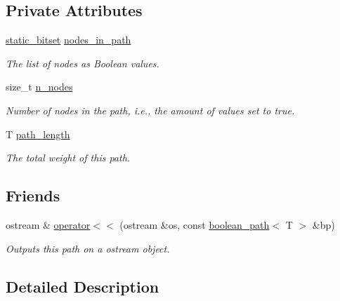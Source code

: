 \subsection*{Private Attributes}
\begin{DoxyCompactItemize}
\item 
\hyperlink{classlgraph_1_1utils_1_1static__bitset}{static\+\_\+bitset} \hyperlink{classlgraph_1_1utils_1_1boolean__path_ab94143c4100d65e2989fb150d6112818}{nodes\+\_\+in\+\_\+path}
\begin{DoxyCompactList}\small\item\em The list of nodes as Boolean values. \end{DoxyCompactList}\item 
size\+\_\+t \hyperlink{classlgraph_1_1utils_1_1boolean__path_a9798bc25ba71adebcd38abe36db471ca}{n\+\_\+nodes}\hypertarget{classlgraph_1_1utils_1_1boolean__path_a9798bc25ba71adebcd38abe36db471ca}{}\label{classlgraph_1_1utils_1_1boolean__path_a9798bc25ba71adebcd38abe36db471ca}

\begin{DoxyCompactList}\small\item\em Number of nodes in the path, i.\+e., the amount of values set to true. \end{DoxyCompactList}\item 
T \hyperlink{classlgraph_1_1utils_1_1boolean__path_a35ff8125a2ef2418feb576d2fe528517}{path\+\_\+length}
\begin{DoxyCompactList}\small\item\em The total weight of this path. \end{DoxyCompactList}\end{DoxyCompactItemize}
\subsection*{Friends}
\begin{DoxyCompactItemize}
\item 
ostream \& \hyperlink{classlgraph_1_1utils_1_1boolean__path_a5f7334ccc188792f571109cd67e73d0d}{operator$<$$<$} (ostream \&os, const \hyperlink{classlgraph_1_1utils_1_1boolean__path}{boolean\+\_\+path}$<$ T $>$ \&bp)
\begin{DoxyCompactList}\small\item\em Outputs this path on a {\itshape ostream} object. \end{DoxyCompactList}\end{DoxyCompactItemize}


\subsection{Detailed Description}

